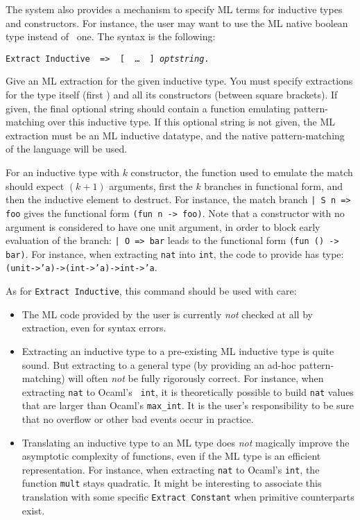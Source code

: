 The system also provides a mechanism to specify ML terms for inductive
types and constructors.  For instance, the user may want to use the ML
native boolean type instead of \Coq\ one.  The syntax is the following:

\begin{description}
\item{\tt Extract Inductive \qualid\ => \str\ [ \str\ \dots\ \str\ ] {\it optstring}.}\par
  Give an ML extraction for the given inductive type. You must specify
  extractions for the type itself (first \str) and all its
  constructors (between square brackets). If given, the final optional
  string should contain a function emulating pattern-matching over this
  inductive type. If this optional string is not given, the ML
  extraction must be an ML inductive datatype, and the native
  pattern-matching of the language will be used.
\end{description}

\noindent For an inductive type with $k$ constructor, the function used to
emulate the match should expect $(k+1)$ arguments, first the $k$
branches in functional form, and then the inductive element to
destruct. For instance, the match branch \verb$| S n => foo$ gives the
functional form \verb$(fun n -> foo)$. Note that a constructor with no
argument is considered to have one unit argument, in order to block
early evaluation of the branch: \verb$| O => bar$ leads to the functional
form \verb$(fun () -> bar)$. For instance, when extracting {\tt nat}
into {\tt int}, the code to provide has type:
{\tt (unit->'a)->(int->'a)->int->'a}.
    
As for {\tt Extract Inductive}, this command should be used with care:
\begin{itemize}
\item The ML code provided by the user is currently \emph{not} checked at all by
  extraction, even for syntax errors.

\item Extracting an inductive type to a pre-existing ML inductive type
is quite sound. But extracting to a general type (by providing an
ad-hoc pattern-matching) will often \emph{not} be fully rigorously
correct.  For instance, when extracting {\tt nat} to Ocaml's {\tt
int}, it is theoretically possible to build {\tt nat} values that are
larger than Ocaml's {\tt max\_int}. It is the user's responsibility to
be sure that no overflow or other bad events occur in practice.

\item Translating an inductive type to an ML type does \emph{not}
magically improve the asymptotic complexity of functions, even if the
ML type is an efficient representation. For instance, when extracting
{\tt nat} to Ocaml's {\tt int}, the function {\tt mult} stays
quadratic. It might be interesting to associate this translation with
some specific {\tt Extract Constant} when primitive counterparts exist.
\end{itemize}

